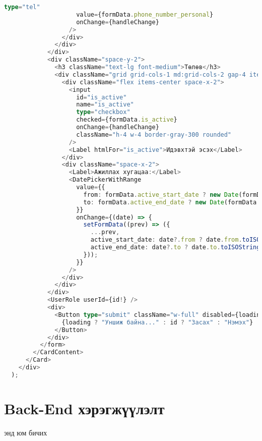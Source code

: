 \begin{lstlisting}[language=Typescript, caption=UI бүтэц, frame=single]
                    type="tel"
                    value={formData.phone_number_personal}
                    onChange={handleChange}
                  />
                </div>
              </div>
            </div>
            <div className="space-y-2">
              <h3 className="text-lg font-medium">Төлөв</h3>
              <div className="grid grid-cols-1 md:grid-cols-2 gap-4 items-center">
                <div className="flex items-center space-x-2">
                  <input
                    id="is_active"
                    name="is_active"
                    type="checkbox"
                    checked={formData.is_active}
                    onChange={handleChange}
                    className="h-4 w-4 border-gray-300 rounded"
                  />
                  <Label htmlFor="is_active">Идэвхтэй эсэх</Label>
                </div>
                <div className="space-x-2">
                  <Label>Ажиллах хугацаа:</Label>
                  <DatePickerWithRange
                    value={{
                      from: formData.active_start_date ? new Date(formData.active_start_date) : undefined,
                      to: formData.active_end_date ? new Date(formData.active_end_date) : undefined,
                    }}
                    onChange={(date) => {
                      setFormData((prev) => ({
                        ...prev,
                        active_start_date: date?.from ? date.from.toISOString(): "",
                        active_end_date: date?.to ? date.to.toISOString() : "",
                      }));
                    }}
                  />
                </div>
              </div>
            </div>
            <UserRole userId={id!} />
            <div>
              <Button type="submit" className="w-full" disabled={loading}>
                {loading ? "Уншиж байна..." : id ? "Засах" : "Нэмэх"}
              </Button>
            </div>
          </form>
        </CardContent>
      </Card>
    </div>
  );
\end{lstlisting}
\pagebreak

\section{Back-End хэрэгжүүлэлт}
энд юм бичих

